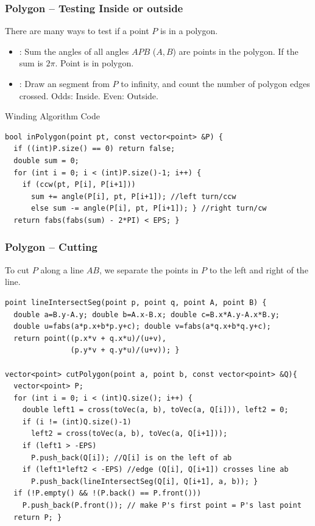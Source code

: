 \documentclass{beamer}
\begin{document}
\begin{frame}[fragile]
  \frametitle{Polygon -- Testing Inside or outside}
  {\smaller
    \begin{block}{There are many ways to test if a point $P$ is in a polygon.}
      \begin{itemize}
      \item {}: Sum the angles of all
        angles $APB$ ($A,B$) are points in the polygon. If the sum is
        $2\pi$. Point is in polygon. 
      \item {}: Draw an segment from
        $P$ to infinity, and count the number of polygon edges
        crossed. Odds: Inside. Even: Outside.
      \end{itemize}
    \end{block}

    \begin{exampleblock}{Winding Algorithm Code}
\begin{verbatim}
bool inPolygon(point pt, const vector<point> &P) {
  if ((int)P.size() == 0) return false;
  double sum = 0;
  for (int i = 0; i < (int)P.size()-1; i++) {
    if (ccw(pt, P[i], P[i+1]))
      sum += angle(P[i], pt, P[i+1]); //left turn/ccw
      else sum -= angle(P[i], pt, P[i+1]); } //right turn/cw
  return fabs(fabs(sum) - 2*PI) < EPS; }
\end{verbatim}
    \end{exampleblock}
  }
\end{frame}

\begin{frame}[fragile]
  \frametitle{Polygon -- Cutting}
  {\smaller
    \begin{block}{}
      To cut $P$ along a line $AB$, we separate the points in $P$ to the 
      left and right of the line.
    \end{block}
    
{\smaller
    \begin{exampleblock}{}
\begin{verbatim}
point lineIntersectSeg(point p, point q, point A, point B) {
  double a=B.y-A.y; double b=A.x-B.x; double c=B.x*A.y-A.x*B.y;
  double u=fabs(a*p.x+b*p.y+c); double v=fabs(a*q.x+b*q.y+c);
  return point((p.x*v + q.x*u)/(u+v), 
               (p.y*v + q.y*u)/(u+v)); }

vector<point> cutPolygon(point a, point b, const vector<point> &Q){
  vector<point> P;
  for (int i = 0; i < (int)Q.size(); i++) {
    double left1 = cross(toVec(a, b), toVec(a, Q[i])), left2 = 0;
    if (i != (int)Q.size()-1) 
      left2 = cross(toVec(a, b), toVec(a, Q[i+1]));
    if (left1 > -EPS) 
      P.push_back(Q[i]); //Q[i] is on the left of ab
    if (left1*left2 < -EPS) //edge (Q[i], Q[i+1]) crosses line ab
      P.push_back(lineIntersectSeg(Q[i], Q[i+1], a, b)); }
  if (!P.empty() && !(P.back() == P.front()))
    P.push_back(P.front()); // make P's first point = P's last point
  return P; }
\end{verbatim}
    \end{exampleblock}}
  }
\end{frame}
\end{document}
